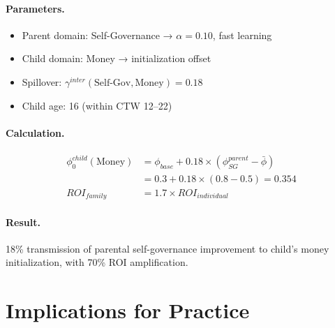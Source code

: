\paragraph{Parameters.}
\begin{itemize}
\item Parent domain: Self-Governance → $\alpha = 0.10$, fast learning
\item Child domain: Money → initialization offset
\item Spillover: $\gamma^{inter}(\text{Self-Gov}, \text{Money}) = 0.18$
\item Child age: 16 (within CTW 12--22)
\end{itemize}

\paragraph{Calculation.}
\begin{align}
\phi_0^{child}(\text{Money}) &= \phi_{base} + 0.18 \times (\phi^{parent}_{SG} - \bar{\phi}) \\
&= 0.3 + 0.18 \times (0.8 - 0.5) = 0.354 \\
ROI_{family} &= 1.7 \times ROI_{individual}
\end{align}

\paragraph{Result.} 18\% transmission of parental self-governance improvement to child's money initialization, with 70\% ROI amplification.


\section{Implications for Practice}
\label{sec:calc-practice}

